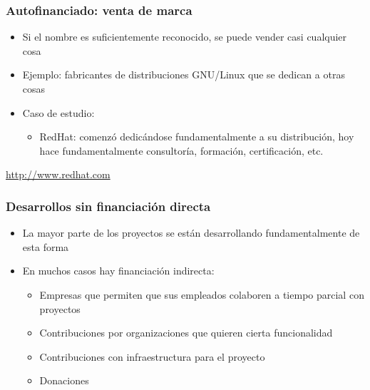 
\begin{frame}
\frametitle{Autofinanciado: venta de marca}

\begin{itemize}
\item Si el nombre es suficientemente reconocido, se puede vender casi
  cualquier cosa
\item Ejemplo: fabricantes de distribuciones GNU/Linux que se dedican
  a otras cosas
\item Caso de estudio:
  \begin{itemize}
  \item RedHat: comenzó dedicándose fundamentalmente a su
    distribución, hoy hace fundamentalmente consultoría, formación,
    certificación, etc.
  \end{itemize}
\end{itemize}

\begin{flushright}
  \url{http://www.redhat.com}
\end{flushright}
\end{frame}


\begin{frame}
\frametitle{Desarrollos sin financiación directa}

\begin{itemize}
\item La mayor parte de los proyectos se están desarrollando
  fundamentalmente de esta forma
\item En muchos casos hay financiación indirecta:
  \begin{itemize}
  \item Empresas que permiten que sus empleados colaboren a tiempo
    parcial con proyectos
  \item Contribuciones por organizaciones que quieren cierta
    funcionalidad
  \item Contribuciones con infraestructura para el proyecto
  \item Donaciones
  \end{itemize}
\end{itemize}
\end{frame}


